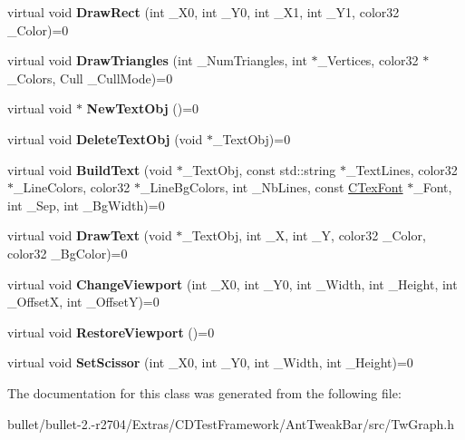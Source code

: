 \begin{DoxyCompactItemize}
\item 
\hypertarget{class_i_tw_graph_a27e6ac42b7f76e40b924d882df431cc4}{virtual void {\bfseries Draw\+Rect} (int \+\_\+\+X0, int \+\_\+\+Y0, int \+\_\+\+X1, int \+\_\+\+Y1, color32 \+\_\+\+Color)=0}\label{class_i_tw_graph_a27e6ac42b7f76e40b924d882df431cc4}

\item 
\hypertarget{class_i_tw_graph_a05429cae97ab2dd99835db76fae28219}{virtual void {\bfseries Draw\+Triangles} (int \+\_\+\+Num\+Triangles, int $\ast$\+\_\+\+Vertices, color32 $\ast$\+\_\+\+Colors, Cull \+\_\+\+Cull\+Mode)=0}\label{class_i_tw_graph_a05429cae97ab2dd99835db76fae28219}

\item 
\hypertarget{class_i_tw_graph_a6660e06ac5484c52f03890ebd6ae534b}{virtual void $\ast$ {\bfseries New\+Text\+Obj} ()=0}\label{class_i_tw_graph_a6660e06ac5484c52f03890ebd6ae534b}

\item 
\hypertarget{class_i_tw_graph_a25df583497bc5dadb0bd53ab08f960a3}{virtual void {\bfseries Delete\+Text\+Obj} (void $\ast$\+\_\+\+Text\+Obj)=0}\label{class_i_tw_graph_a25df583497bc5dadb0bd53ab08f960a3}

\item 
\hypertarget{class_i_tw_graph_ad748d77791aac42e39340000d2aca8e8}{virtual void {\bfseries Build\+Text} (void $\ast$\+\_\+\+Text\+Obj, const std\+::string $\ast$\+\_\+\+Text\+Lines, color32 $\ast$\+\_\+\+Line\+Colors, color32 $\ast$\+\_\+\+Line\+Bg\+Colors, int \+\_\+\+Nb\+Lines, const \hyperlink{struct_c_tex_font}{C\+Tex\+Font} $\ast$\+\_\+\+Font, int \+\_\+\+Sep, int \+\_\+\+Bg\+Width)=0}\label{class_i_tw_graph_ad748d77791aac42e39340000d2aca8e8}

\item 
\hypertarget{class_i_tw_graph_a453dbb3917c3156d29d5acda9fb82ad5}{virtual void {\bfseries Draw\+Text} (void $\ast$\+\_\+\+Text\+Obj, int \+\_\+\+X, int \+\_\+\+Y, color32 \+\_\+\+Color, color32 \+\_\+\+Bg\+Color)=0}\label{class_i_tw_graph_a453dbb3917c3156d29d5acda9fb82ad5}

\item 
\hypertarget{class_i_tw_graph_a6c82bac9e6f120f6ddb25d9e6f2b2306}{virtual void {\bfseries Change\+Viewport} (int \+\_\+\+X0, int \+\_\+\+Y0, int \+\_\+\+Width, int \+\_\+\+Height, int \+\_\+\+Offset\+X, int \+\_\+\+Offset\+Y)=0}\label{class_i_tw_graph_a6c82bac9e6f120f6ddb25d9e6f2b2306}

\item 
\hypertarget{class_i_tw_graph_ad2c7491e510b5fbb7b97cca699734b47}{virtual void {\bfseries Restore\+Viewport} ()=0}\label{class_i_tw_graph_ad2c7491e510b5fbb7b97cca699734b47}

\item 
\hypertarget{class_i_tw_graph_a045a20df67da3827b52397d060701e6b}{virtual void {\bfseries Set\+Scissor} (int \+\_\+\+X0, int \+\_\+\+Y0, int \+\_\+\+Width, int \+\_\+\+Height)=0}\label{class_i_tw_graph_a045a20df67da3827b52397d060701e6b}

\end{DoxyCompactItemize}


The documentation for this class was generated from the following file\+:\begin{DoxyCompactItemize}
\item 
bullet/bullet-\/2.-\/r2704/\+Extras/\+C\+D\+Test\+Framework/\+Ant\+Tweak\+Bar/src/Tw\+Graph.\+h\end{DoxyCompactItemize}

